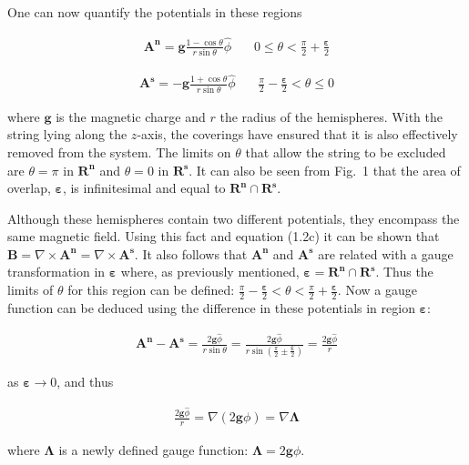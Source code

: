 \documentclass[fleqn, twocolumn, 10pt]{article}
\begin{document}
\indent One can now quantify the potentials in these regions

\begin{ceqn}
\begin{align*}
\mathbf{A^n} = \bm{g}\frac{1 - \cos\theta}{r\sin\theta}\hat\phi \ \ \ \ \ \ \ \ 0 \leq \theta < \frac{\pi}{2} + \frac{\bm{\varepsilon}}{2}
\end{align*}
\end{ceqn}
\begin{ceqn}
\begin{align*}
\mathbf{A^s} = -\bm{g}\frac{1 + \cos\theta}{r\sin\theta}\hat\phi \ \ \ \ \ \ \ \ \frac{\pi}{2} - \frac{\bm{\varepsilon}}{2} < \theta \leq 0
\end{align*}
\end{ceqn}
where $\bm{g}$ is the magnetic charge and $r$ the radius of the hemispheres. With the string lying along the $z$-axis, the coverings have ensured that it is also effectively removed from the system. The limits on $\theta$ that allow the string to be excluded are $\theta = \pi$ in $\mathbf{R^n}$ and $\theta = 0$ in $\mathbf{R^s}$. It can also be seen from Fig.~1 that the area of overlap, $\bm{\varepsilon}$, is infinitesimal and equal to $\mathbf{R^n}\cap\mathbf{R^s}$. 

Although these hemispheres contain two different potentials,  they encompass the same magnetic field. Using this fact and equation (1.2c) it can be shown that $\mathbf{B} = \nabla\times\mathbf{A^n} = \nabla\times\mathbf{A^s}$. It also follows that $\mathbf{A^n}$ and $\mathbf{A^s}$ are related with a gauge transformation in $\bm{\varepsilon}$ where, as previously mentioned, $\bm{\varepsilon}=\mathbf{R^n}\cap\mathbf{R^s}$. Thus the limits of $\theta$ for this region can be defined: $\frac{\pi}{2} - \frac{\bm{\varepsilon}}{2} < \theta < \frac{\pi}{2} + \frac{\bm{\varepsilon}}{2}$. Now a gauge function can be deduced using the difference in these potentials in region $\bm{\varepsilon}$:

\begin{ceqn}
\begin{align*}
\mathbf{A^n}-\mathbf{A^s}=\frac{2\bm{g}\hat\phi}{r\sin\theta}=\frac{2\bm{g}\hat\phi}{r\sin(\frac{\pi}{2}\pm\frac{\bm{\varepsilon}}{2})}=\frac{2\bm{g}\hat\phi}{r}
\end{align*}
\end{ceqn}
as $\bm{\varepsilon}\longrightarrow0$, and thus

\begin{ceqn}
\begin{align*}
\frac{2\bm{g}\hat\phi}{r} = \nabla(2\bm{g}\phi) = \nabla\bm{\Lambda}
\end{align*}
\end{ceqn}
where $\bm{\Lambda}$ is a newly defined gauge function: $\bm{\Lambda} = 2\bm{g}\phi$.
\end{document}
